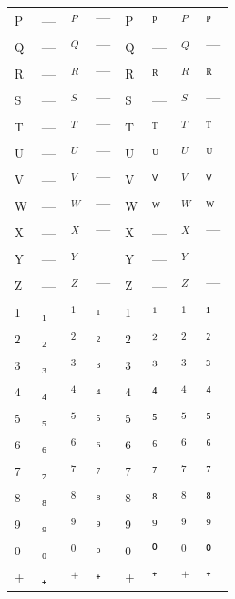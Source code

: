 \documentclass{standalone}
\begin{document}
\begin{tabular}{ll|ll|ll|ll}
\textsubscript{P} & — & $_{P}$ & $—$ & \textsuperscript{P} & ᴾ & $^{P}$ & $ᴾ$ \\
\textsubscript{Q} & — & $_{Q}$ & $—$ & \textsuperscript{Q} & — & $^{Q}$ & $—$ \\
\textsubscript{R} & — & $_{R}$ & $—$ & \textsuperscript{R} & ᴿ & $^{R}$ & $ᴿ$ \\
\textsubscript{S} & — & $_{S}$ & $—$ & \textsuperscript{S} & — & $^{S}$ & $—$ \\
\textsubscript{T} & — & $_{T}$ & $—$ & \textsuperscript{T} & ᵀ & $^{T}$ & $ᵀ$ \\
\textsubscript{U} & — & $_{U}$ & $—$ & \textsuperscript{U} & ᵁ & $^{U}$ & $ᵁ$ \\
\textsubscript{V} & — & $_{V}$ & $—$ & \textsuperscript{V} & ⱽ & $^{V}$ & $ⱽ$ \\
\textsubscript{W} & — & $_{W}$ & $—$ & \textsuperscript{W} & ᵂ & $^{W}$ & $ᵂ$ \\
\textsubscript{X} & — & $_{X}$ & $—$ & \textsuperscript{X} & — & $^{X}$ & $—$ \\
\textsubscript{Y} & — & $_{Y}$ & $—$ & \textsuperscript{Y} & — & $^{Y}$ & $—$ \\
\textsubscript{Z} & — & $_{Z}$ & $—$ & \textsuperscript{Z} & — & $^{Z}$ & $—$ \\
\midrule
\textsubscript{1} & ₁ & $_{1}$ & $₁$ & \textsuperscript{1} & ¹ & $^{1}$ & $¹$ \\
\textsubscript{2} & ₂ & $_{2}$ & $₂$ & \textsuperscript{2} & ² & $^{2}$ & $²$ \\
\textsubscript{3} & ₃ & $_{3}$ & $₃$ & \textsuperscript{3} & ³ & $^{3}$ & $³$ \\
\textsubscript{4} & ₄ & $_{4}$ & $₄$ & \textsuperscript{4} & ⁴ & $^{4}$ & $⁴$ \\
\textsubscript{5} & ₅ & $_{5}$ & $₅$ & \textsuperscript{5} & ⁵ & $^{5}$ & $⁵$ \\
\textsubscript{6} & ₆ & $_{6}$ & $₆$ & \textsuperscript{6} & ⁶ & $^{6}$ & $⁶$ \\
\textsubscript{7} & ₇ & $_{7}$ & $₇$ & \textsuperscript{7} & ⁷ & $^{7}$ & $⁷$ \\
\textsubscript{8} & ₈ & $_{8}$ & $₈$ & \textsuperscript{8} & ⁸ & $^{8}$ & $⁸$ \\
\textsubscript{9} & ₉ & $_{9}$ & $₉$ & \textsuperscript{9} & ⁹ & $^{9}$ & $⁹$ \\
\textsubscript{0} & ₀ & $_{0}$ & $₀$ & \textsuperscript{0} & ⁰ & $^{0}$ & $⁰$ \\
\midrule
\textsubscript{+} & ₊ & $_{+}$ & $₊$ & \textsuperscript{+} & ⁺ & $^{+}$ & $⁺$ \\

\end{tabular}
\end{document}
